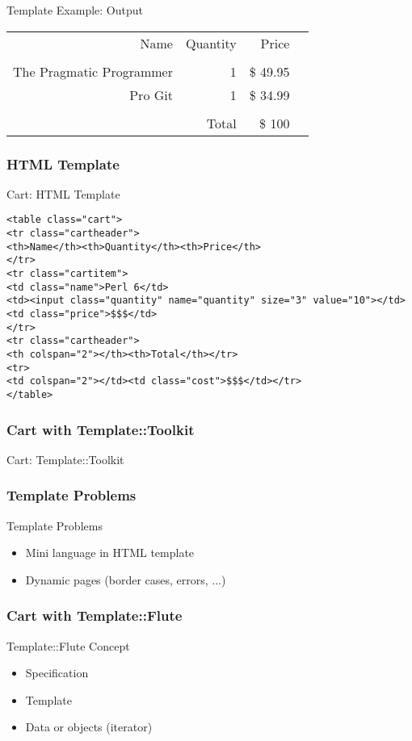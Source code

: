 \begin{frame}{Template Example: Output}
\begin{tabular}[t]{rrrr}
\hfill Name & Quantity & Price \\
\hfill & & \\
\hfill The Pragmatic Programmer & 1 & \$ 49.95 \\
\hfill Pro Git & 1 & \$ 34.99 \\
\hfill & & \\
\hfill & Total & \$ 100
\end{tabular}
\end{frame}

\subsubsection{HTML Template}
\begin{frame}[fragile]{Cart: HTML Template}
\begin{lstlisting}
<table class="cart">
<tr class="cartheader">
<th>Name</th><th>Quantity</th><th>Price</th>
</tr>
<tr class="cartitem">
<td class="name">Perl 6</td>
<td><input class="quantity" name="quantity" size="3" value="10"></td>
<td class="price">$$$</td>
</tr>
<tr class="cartheader">
<th colspan="2"></th><th>Total</th></tr>
<tr>
<td colspan="2"></td><td class="cost">$$$</td></tr>
</table>
\end{lstlisting}
\end{frame}

\subsubsection{Cart with Template::Toolkit}
\begin{frame}[fragile]{Cart: Template::Toolkit}

\end{frame}

\subsubsection{Template Problems}
\begin{frame}{Template Problems}
 \begin{itemize}
  \item Mini language in HTML template
  \item Dynamic pages (border cases, errors, ...)
 \end{itemize}
\end{frame}
\subsubsection{Cart with Template::Flute}
\begin{frame}{Template::Flute Concept}
 \begin{itemize}
  \item Specification
  \item Template
  \item Data or objects (iterator)
 \end{itemize}
\end{frame}
